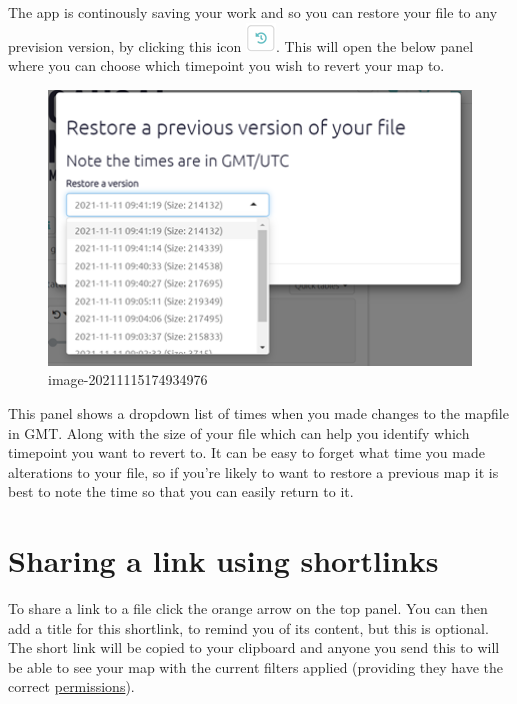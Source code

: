 \documentclass[
]{book}
\begin{document}
The app is continously saving your work and so you can restore your file to any prevision version, by clicking this icon \includegraphics{_assets/image-20211115175030770.png}. This will open the below panel where you can choose which timepoint you wish to revert your map to.

\begin{figure}
\centering
\includegraphics[width=6.77083in,height=\textheight]{_assets/image-20211115174934976.png}
\caption{image-20211115174934976}
\end{figure}

This panel shows a dropdown list of times when you made changes to the mapfile in GMT. Along with the size of your file which can help you identify which timepoint you want to revert to. It can be easy to forget what time you made alterations to your file, so if you're likely to want to restore a previous map it is best to note the time so that you can easily return to it.

\hypertarget{xshortlinks}{%
\section{Sharing a link using shortlinks}\label{xshortlinks}}

To share a link to a file click the orange arrow on the top panel. You can then add a title for this shortlink, to remind you of its content, but this is optional. The short link will be copied to your clipboard and anyone you send this to will be able to see your map with the current filters applied (providing they have the correct \protect\hyperlink{xpermissions}{permissions}).
\end{document}
